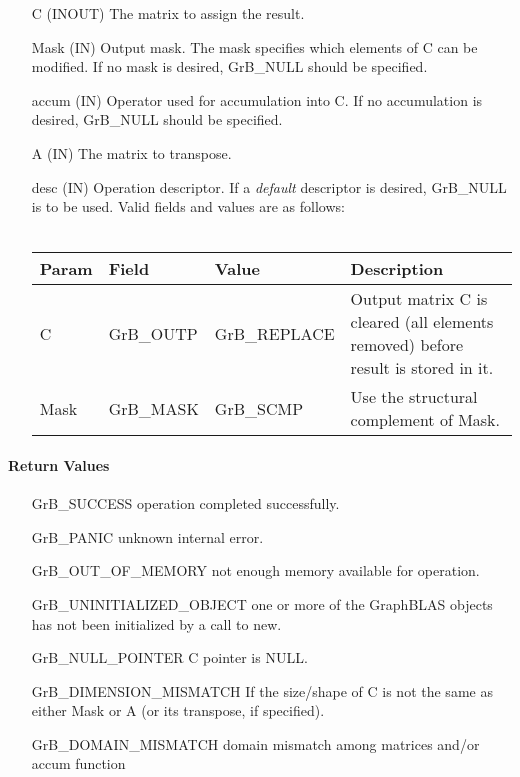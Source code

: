 \begin{itemize}[leftmargin=1.1in]
    \item[{\sf C}]     ({\sf INOUT}) The matrix to assign the result.

    \item[{\sf Mask}]  ({\sf IN}) Output mask. The mask specifies which elements
    of {\sf C} can be modified. If no mask is desired, {\sf GrB\_NULL} should be specified.

    \item[{\sf accum}] ({\sf IN}) Operator used for accumulation into {\sf C}.  If no accumulation
                        is desired, {\sf GrB\_NULL} should be specified.

    \item[{\sf A}]     ({\sf IN}) The matrix to transpose.

    \item[{\sf desc}]  ({\sf IN}) Operation descriptor. If a
    \emph{default} descriptor is desired, {\sf GrB\_NULL} is to be
    used.  Valid fields and values are as follows: \\ ~\\
    \begin{tabular}{lllp{2.5in}}
    Param & Field  & Value & Description \\
    \hline
    {\sf C}    & {\sf GrB\_OUTP} & {\sf GrB\_REPLACE} & Output matrix {\sf C} is cleared (all elements removed) before result is stored in it. \\
    {\sf Mask} & {\sf GrB\_MASK} & {\sf GrB\_SCMP}   & Use the structural complement of {\sf Mask}. \\
    \end{tabular}
\end{itemize}

\paragraph{Return Values}

\begin{itemize}[leftmargin=2.1in]
\item[{\sf GrB\_SUCCESS}]     operation completed successfully.
\item[{\sf GrB\_PANIC}]        unknown internal error.

\item[{\sf GrB\_OUT\_OF\_MEMORY}]          not enough memory available for operation.
\item[{\sf GrB\_UNINITIALIZED\_OBJECT}]          one or more of the GraphBLAS objects has
                                    not been initialized by a call to {\sf new}.
\item[{\sf GrB\_NULL\_POINTER}]    {\sf C} pointer is {\sf NULL}.

\item[{\sf GrB\_DIMENSION\_MISMATCH}]      
        If the size/shape of {\sf C} is not the same as either {\sf Mask} or {\sf A} (or its transpose, if specified).
\item[{\sf GrB\_DOMAIN\_MISMATCH}]  
        domain mismatch among matrices and/or
        accum function 
\end{itemize}

